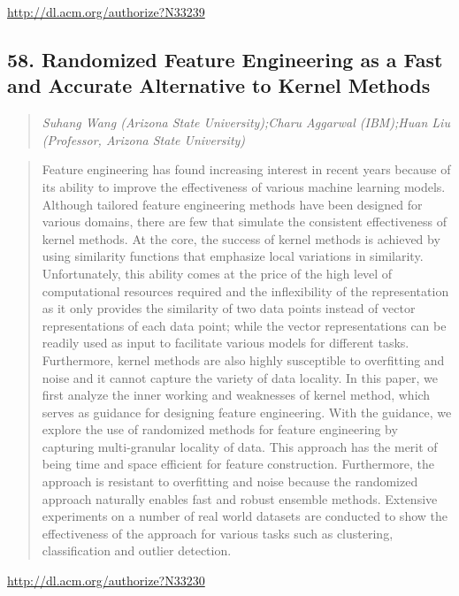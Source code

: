 \documentclass{article}
\begin{document}
\href{http://dl.acm.org/authorize?N33239}{http://dl.acm.org/authorize?N33239}

\subsection{58. Randomized Feature Engineering as a Fast and Accurate Alternative to Kernel Methods}

\begin{quote}
\footnotesize{\textit{Suhang Wang (Arizona State University);Charu Aggarwal (IBM);Huan Liu (Professor, Arizona State University)}}

\end{quote}

\begin{quote}
Feature engineering has found increasing interest in recent years because of its ability to improve the effectiveness of various machine learning models. Although tailored feature engineering methods have been designed for various domains, there are few that simulate the consistent effectiveness of kernel methods. At the core, the success of kernel methods is achieved by using similarity functions that emphasize local variations in similarity. Unfortunately, this ability comes at the price of the high level of computational resources required and the inflexibility of the representation as it only provides the similarity of two data points instead of vector representations of each data point; while the vector representations can be readily used as input to facilitate various models for different tasks. Furthermore, kernel methods are also highly susceptible to overfitting and noise and it cannot capture the variety of data locality. In this paper, we first analyze the inner working and weaknesses of kernel method, which serves as guidance for designing feature engineering. With the guidance, we explore the use of randomized methods for feature engineering by capturing multi-granular locality of data. This approach has the merit of being time and space efficient for feature construction. Furthermore, the approach is resistant to overfitting and noise because the randomized approach naturally enables fast and robust ensemble methods. Extensive experiments on a number of real world datasets are conducted to show the effectiveness of the approach for various tasks such as clustering, classification and outlier detection.
\end{quote}

\href{http://dl.acm.org/authorize?N33230}{http://dl.acm.org/authorize?N33230}
\end{document}
